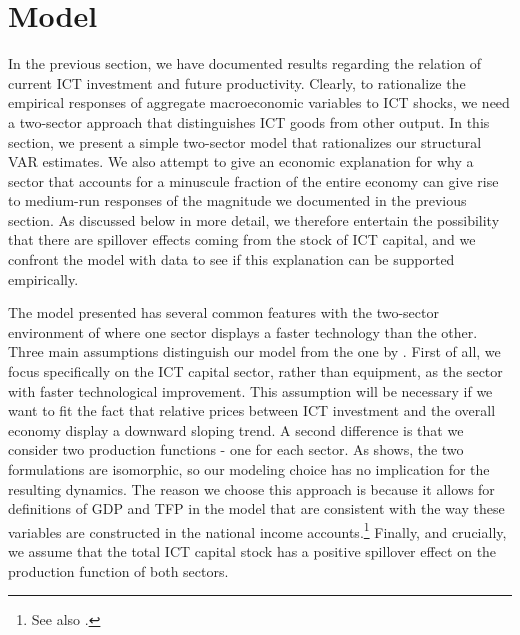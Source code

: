 \documentclass[12pt]{article}
\begin{document}


\section{Model}\label{section:theory}

In the previous section, we have documented results regarding the relation of current ICT investment and future productivity. Clearly, to rationalize the empirical responses of aggregate macroeconomic variables to ICT shocks, we need a two-sector approach that distinguishes ICT goods from other output. In this section, we present a simple two-sector model that rationalizes our structural VAR estimates. We also attempt to give an economic explanation for why a sector that accounts for a minuscule fraction of the entire economy can give rise to medium-run responses of the magnitude we documented in the previous section. As discussed below in more detail, we therefore entertain the possibility that there are spillover effects coming from the stock of ICT capital, and we confront the model with data to see if this explanation can be supported empirically.

The model presented has several common features with the two-sector environment of \cite{greenwood1997long} where one sector displays a faster technology than the other. Three main assumptions distinguish our model from the one by \cite{greenwood1997long}. First of all, we focus specifically on the ICT capital sector, rather than equipment, as the sector with faster technological improvement. This assumption will be necessary if we want to fit the fact that relative prices between ICT investment and the overall economy display a downward sloping trend. A second difference is that we consider two production functions - one for each sector. As \cite{oulton2007investment} shows, the two formulations are isomorphic, so our modeling choice has no implication for the resulting dynamics. The reason we choose this approach is because it allows for definitions of GDP and TFP in the model that are consistent with the way these variables are constructed in the national income accounts.\footnote{See also \cite{whelan2003two}.} Finally, and crucially, we assume that the total ICT capital stock has a positive spillover effect on the production function of both sectors. 
\end{document}
